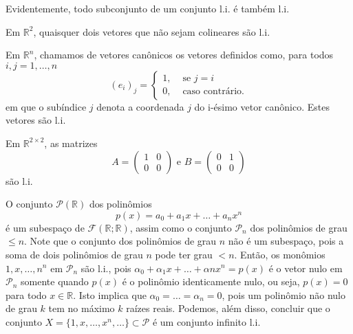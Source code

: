 Evidentemente, todo subconjunto de um conjunto l.i. é também l.i.

\begin{exemplo}
	Em ${\mathbb{R}}^2$, quaisquer dois vetores que não sejam colineares são l.i. 
\end{exemplo}

\begin{exemplo}
	Em ${\mathbb{R}}^n$, chamamos de vetores canônicos os vetores definidos como, para todos $i,j = 1,\ldots,n$
    \begin{equation*}
    (e_i)_j = \begin{cases}
    1, & \mbox{ se } j = i\\
    0, & \mbox{ caso contrário.}
    \end{cases}
    \end{equation*}
    em que o subíndice $j$ denota a coordenada $j$ do i-ésimo vetor canônico. Estes vetores são l.i.
\end{exemplo}

\begin{exemplo}
	Em ${\mathbb{R}}^{2\times 2}$, as matrizes
    \begin{equation*}
    A = \begin{pmatrix} 1 & 0\\0 & 0\end{pmatrix} \text{ e } B = \begin{pmatrix} 0 & 1\\0 & 0\end{pmatrix}
    \end{equation*}
    são l.i.
\end{exemplo}

\begin{exemplo}
  O conjunto ${\mathcal{P}}({\mathbb{R}})$ dos polinômios
  \begin{equation*}
    p(x) = a_0 + a_1x + \ldots + a_nx^n
  \end{equation*}
  é um subespaço de ${\mathcal{F}}({\mathbb{R}} ;{\mathbb{R}})$, assim como o conjunto ${\mathcal{P}}_n$ dos polinômios de grau $\leq n$. Note que o conjunto dos polinômios de grau $n$ não é um subespaço, pois a soma de dois polinômios de grau $n$ pode ter grau $<n$. Então, os monômios $1,x,\ldots,n^n$ em ${\mathcal{P}}_n$ são l.i., pois $\alpha_0 + \alpha_1 x + \ldots + \alpha n x^n = p(x)$ é o vetor nulo em ${\mathcal{P}}_n$ somente quando $p(x)$ é o polinômio identicamente nulo, ou seja, $p(x) = 0 $ para todo $x\in {\mathbb{R}}$. Isto implica que $\alpha_0 = \ldots = \alpha_n=0$, pois um polinômio não nulo de grau $k$ tem no máximo $k$ raízes reais. Podemos, além disso, concluir que o conjunto $X = \{ 1,x,\ldots,x^n,\ldots\}\subset {\mathcal{P}}$ é um conjunto infinito l.i.
\end{exemplo}

